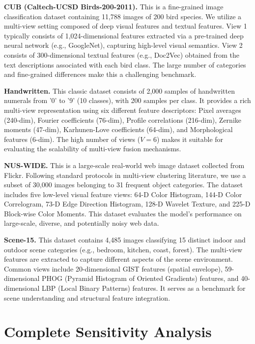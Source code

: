 \documentclass{article}
\theoremstyle{plain}
\theoremstyle{definition}
\theoremstyle{remark}
\begin{document}
\textbf{CUB (Caltech-UCSD Birds-200-2011).} This is a fine-grained image classification dataset containing 11,788 images of 200 bird species. We utilize a multi-view setting composed of deep visual features and textual features. View 1 typically consists of 1,024-dimensional features extracted via a pre-trained deep neural network (e.g., GoogleNet), capturing high-level visual semantics. View 2 consists of 300-dimensional textual features (e.g., Doc2Vec) obtained from the text descriptions associated with each bird class. The large number of categories and fine-grained differences make this a challenging benchmark.

\textbf{Handwritten.} This classic dataset consists of 2,000 samples of handwritten numerals from '0' to '9' (10 classes), with 200 samples per class. It provides a rich multi-view representation using six different feature descriptors: Pixel averages (240-dim), Fourier coefficients (76-dim), Profile correlations (216-dim), Zernike moments (47-dim), Karhunen-Love coefficients (64-dim), and Morphological features (6-dim). The high number of views ($V=6$) makes it suitable for evaluating the scalability of multi-view fusion mechanisms.

\textbf{NUS-WIDE.} This is a large-scale real-world web image dataset collected from Flickr. Following standard protocols in multi-view clustering literature, we use a subset of 30,000 images belonging to 31 frequent object categories. The dataset includes five low-level visual feature views: 64-D Color Histogram, 144-D Color Correlogram, 73-D Edge Direction Histogram, 128-D Wavelet Texture, and 225-D Block-wise Color Moments. This dataset evaluates the model's performance on large-scale, diverse, and potentially noisy web data.

\textbf{Scene-15.} This dataset contains 4,485 images classifying 15 distinct indoor and outdoor scene categories (e.g., bedroom, kitchen, coast, forest). The multi-view features are extracted to capture different aspects of the scene environment. Common views include 20-dimensional GIST features (spatial envelope), 59-dimensional PHOG (Pyramid Histogram of Oriented Gradients) features, and 40-dimensional LBP (Local Binary Patterns) features. It serves as a benchmark for scene understanding and structural feature integration.

\section{Complete Sensitivity Analysis}
\label{app:sensitivity}
\end{document}
